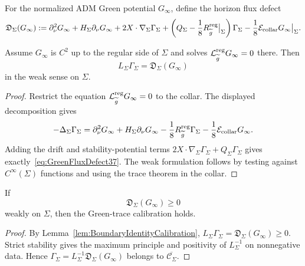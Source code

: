 \begin{definition}\label{def:GreenFluxDefect}
For the normalized ADM Green potential \(G_\infty\), define the horizon flux defect
\begin{equation}\label{eq:GreenFluxDefect37}
    \mathfrak D_\Sigma(G_\infty)
    :=
    \partial_\nu^2G_\infty
    +H_\Sigma\partial_\nu G_\infty
    +2X\cdot\nabla_\Sigma\Gamma_\Sigma
    +\left(Q_\Sigma-\frac18 R_{\widetilde{g}}^{\mathrm{reg}}\big|_\Sigma\right)\Gamma_\Sigma
    -\frac18\mathcal E_{\mathrm{collar}}G_\infty\big|_\Sigma .
\end{equation}
\end{definition}

\begin{lemma}\label{lem:BoundaryIdentityCalibration}
Assume \(G_\infty\) is \(C^2\) up to the regular side of \(\Sigma\) and solves \(\mathcal L_{\widetilde{g}}^{\mathrm{reg}}G_\infty=0\) there. Then
\begin{equation}\label{eq:BoundaryIdentityCalibration}
    L_\Sigma\Gamma_\Sigma=\mathfrak D_\Sigma(G_\infty)
\end{equation}
in the weak sense on \(\Sigma\).
\end{lemma}

\begin{proof}
Restrict the equation \(\mathcal L_{\widetilde{g}}^{\mathrm{reg}}G_\infty=0\) to the collar. The displayed decomposition gives
\[
    -\Delta_\Sigma\Gamma_\Sigma
    =
    \partial_\nu^2G_\infty
    +H_\Sigma\partial_\nu G_\infty
    -\frac18 R_{\widetilde{g}}^{\mathrm{reg}}\Gamma_\Sigma
    -\frac18\mathcal E_{\mathrm{collar}}G_\infty .
\]
Adding the drift and stability-potential terms \(2X\cdot\nabla_\Sigma\Gamma_\Sigma+Q_\Sigma\Gamma_\Sigma\) gives exactly~\eqref{eq:GreenFluxDefect37}. The weak formulation follows by testing against \(C^\infty(\Sigma)\) functions and using the trace theorem in the collar.
\end{proof}

\begin{corollary}\label{cor:FluxDefectCriterion}
If
\[
    \mathfrak D_\Sigma(G_\infty)\ge0
\]
weakly on \(\Sigma\), then the Green-trace calibration holds.
\end{corollary}

\begin{proof}
By Lemma~\ref{lem:BoundaryIdentityCalibration}, \(L_\Sigma\Gamma_\Sigma=\mathfrak D_\Sigma(G_\infty)\ge0\). Strict stability gives the maximum principle and positivity of \(L_\Sigma^{-1}\) on nonnegative data. Hence \(\Gamma_\Sigma=L_\Sigma^{-1}\mathfrak D_\Sigma(G_\infty)\) belongs to \(\overline{\mathcal C_\Sigma}\).
\end{proof}

